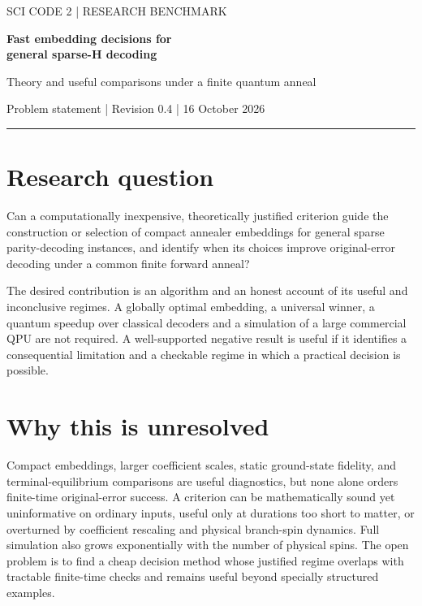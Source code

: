\documentclass[11pt,letterpaper]{article}
\begin{document}
\thispagestyle{plain}
{\color{accent}\small\sffamily SCI CODE 2 | RESEARCH BENCHMARK}\par\vspace{8pt}
{\LARGE\bfseries Fast embedding decisions for\\[2pt] general sparse-H decoding}\par\vspace{5pt}
{\large Theory and useful comparisons under a finite quantum anneal}\par\vspace{5pt}
{\small Problem statement | Revision 0.4 | 16 October 2026}\par\vspace{7pt}
{\color{accent}\hrule}\vspace{10pt}
\section{Research question}
Can a computationally inexpensive, theoretically justified criterion guide the construction or selection of compact annealer embeddings for general sparse parity-decoding instances, and identify when its choices improve original-error decoding under a common finite forward anneal?\par
The desired contribution is an algorithm and an honest account of its useful and inconclusive regimes. A globally optimal embedding, a universal winner, a quantum speedup over classical decoders and a simulation of a large commercial QPU are not required. A well-supported negative result is useful if it identifies a consequential limitation and a checkable regime in which a practical decision is possible.\par
\section{Why this is unresolved}
Compact embeddings, larger coefficient scales, static ground-state fidelity, and terminal-equilibrium comparisons are useful diagnostics, but none alone orders finite-time original-error success. A criterion can be mathematically sound yet uninformative on ordinary inputs, useful only at durations too short to matter, or overturned by coefficient rescaling and physical branch-spin dynamics. Full simulation also grows exponentially with the number of physical spins. The open problem is to find a cheap decision method whose justified regime overlaps with tractable finite-time checks and remains useful beyond specially structured examples.\par
\end{document}
